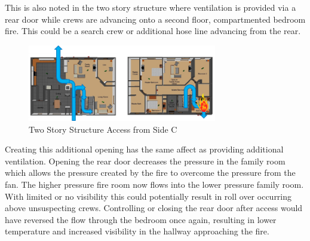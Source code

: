 \documentclass{article}
\begin{document}
This is also noted in the two story structure where ventilation is provided via a rear door while crews are advancing onto a second floor, compartmented bedroom fire. This could be a search crew or additional hose line advancing from the rear. 

\begin{figure} [H]
	\centering
	\includegraphics[width = 3.25in]{0_Images/Tactical_Considerations/Additional_Vent/TwoStoryKitchenVent.png}
	\caption{Two Story Structure Access from Side C}
	\label{fig:AdditionalVents_TwoStoryConfig}
\end{figure}

Creating this additional opening has the same affect as providing additional ventilation. Opening the rear door decreases the pressure in the family room which allows the pressure created by the fire to overcome the pressure from the fan. The higher pressure fire room now flows into the lower pressure family room. With limited or no visibility this could potentially result in roll over occurring above unsuspecting crews. Controlling or closing the rear door after access would have reversed the flow through the bedroom once again, resulting in lower temperature and increased visibility in the hallway approaching the fire. 
\end{document}
